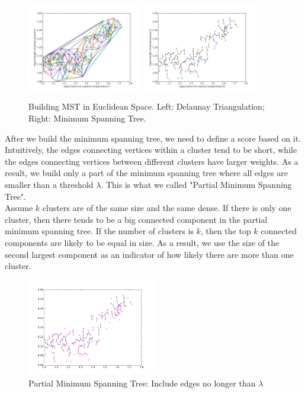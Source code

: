 \documentclass[fleqn]{SelfArx} %
\begin{document}
\begin{center}
\begin{figure}[h]
  \includegraphics[width=0.45\textwidth]{figure_1}
  \includegraphics[width=0.45\textwidth]{figure_2}
  \caption{Building MST in Euclidean Space. Left: Delaunay Triangulation; Right: Minimum Spanning Tree.}
\end{figure}
\end{center}

After we build the minimum spanning tree, we need to define a score based on it. Intuitively, the edges connecting vertices within a cluster tend to be short, while the edges connecting vertices between different clusters have larger weights. As a result, we build only a part of the minimum spanning tree where all edges are smaller than a threshold $\lambda$. This is what we called "Partial Minimum Spanning Tree".\\

Assume $k$ clusters are of the same size and the same dense. If there is only one cluster, then there tends to be a big connected component in the partial minimum spanning tree. If the number of clusters is $k$, then the top $k$ connected components are likely to be equal in size. As a result, we use the size of the second largest component as an indicator of how likely there are more than one cluster. \\

\begin{figure}[h]
  \centering\includegraphics[width=0.5\textwidth]{figure_3}
  \caption{Partial Minimum Spanning Tree: Include edges no longer than $\lambda$}
\end{figure}
\end{document}
